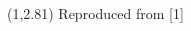 \documentclass[a0]{a0poster}
\def\Ca{Ca$^{2+}$}
\begin{document}
\begin{textblock}{5}


\medskip
\end{textblock}

\begin{textblock}{1.5}(1,2.81)
\small Reproduced from [1]
\end{textblock}
\end{document}
